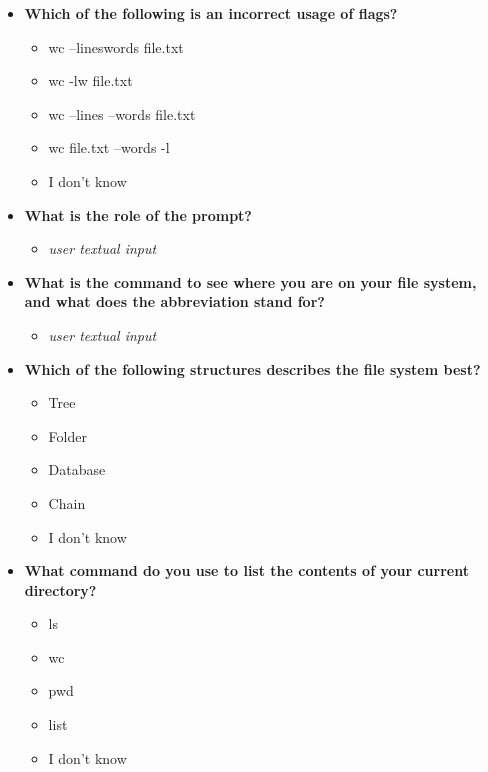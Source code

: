 \begin{itemize}
	\item  \textbf{Which of the following is an incorrect usage of flags?}
	      \begin{itemize}
		      \item wc --lineswords file.txt
		      \item wc -lw file.txt
		      \item wc --lines --words file.txt
		      \item wc file.txt --words -l
		      \item I don't know
	      \end{itemize}

	\item  \textbf{What is the role of the prompt?}
	      \begin{itemize}
		      \item \textit{user textual input}
	      \end{itemize}

	\item  \textbf{What is the command to see where you are on your file system, and what does the abbreviation stand for?}
	      \begin{itemize}
		      \item \textit{user textual input}
	      \end{itemize}

	\item  \textbf{Which of the following structures describes the file system best?}
	      \begin{itemize}
		      \item Tree
		      \item Folder
		      \item Database
		      \item Chain
		      \item I don't know
	      \end{itemize}
	\item  \textbf{What command do you use to list the contents of your current directory?}
	      \begin{itemize}
		      \item ls
		      \item wc
		      \item pwd
		      \item list
		      \item I don't know
	      \end{itemize}


\end{itemize}
